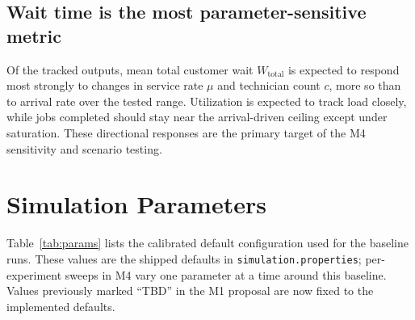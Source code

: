 \documentclass[conference]{IEEEtran}
\begin{document}
\subsection{Wait time is the most parameter-sensitive metric}
Of the tracked outputs, mean total customer wait $W_{\text{total}}$ is
expected to respond most strongly to changes in service rate $\mu$ and
technician count $c$, more so than to arrival rate over the tested range.
Utilization is expected to track load closely, while jobs completed should
stay near the arrival-driven ceiling except under saturation. These
directional responses are the primary target of the M4 sensitivity and
scenario testing.

\appendices
\section{Simulation Parameters}
Table~\ref{tab:params} lists the calibrated default configuration used for the
baseline runs. These values are the shipped defaults in
\texttt{simulation.properties}; per-experiment sweeps in M4 vary one parameter
at a time around this baseline. Values previously marked ``TBD'' in the M1
proposal are now fixed to the implemented defaults.
\end{document}
